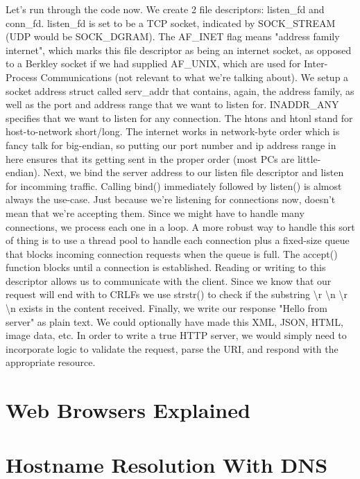 \documentclass{article}
\begin{document}
Let's run through the code now. We create 2 file descriptors: listen\_fd and conn\_fd. listen\_fd is set to be 
a TCP socket, indicated by SOCK\_STREAM (UDP would be SOCK\_DGRAM). The AF\_INET flag means "address family 
internet", which marks this file descriptor as being an internet socket, as opposed to a Berkley socket if we 
had supplied AF\_UNIX, which are used for Inter-Process Communications (not relevant to what we're talking 
about). We setup a socket address struct called serv\_addr that contains, again, the address family, as well as 
the port and address range that we want to listen for. INADDR\_ANY specifies that we want to listen for any 
connection. The htons and htonl stand for host-to-network short/long. The internet works in network-byte 
order which is fancy talk for big-endian, so putting our port number and ip address range in here ensures 
that its getting sent in the proper order (most PCs are little-endian). Next, we bind the server address to 
our listen file descriptor and listen for incomming traffic. Calling bind() immediately followed by listen() is 
almost always the use-case. Just because we're listening for connections now, doesn't mean that we're accepting 
them. Since we might have to handle many connections, we process each one in a loop. A more robust way to handle
this sort of thing is to use a thread pool to handle each connection plus a fixed-size queue that blocks 
incoming connection requests when the queue is full. The accept() function blocks until a connection is 
established. Reading or writing to this descriptor allows us to communicate with the client. Since we know that 
our request will end with to CRLFs we use strstr() to check if the substring 
\textbackslash r \textbackslash n \textbackslash r \textbackslash n exists in the content received. Finally, we 
write our response "Hello from server" as plain text. We could optionally have made this XML, JSON, HTML, 
image data, etc. In order to write a true HTTP server, we would simply need to incorporate logic to validate 
the request, parse the URI, and respond with the appropriate resource. 

\section{Web Browsers Explained}

\section{Hostname Resolution With DNS}
\end{document}
